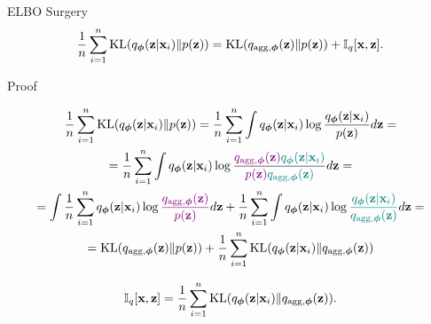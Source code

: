 \documentclass{beamer}
\renewcommand{\eqpause}{}
\renewcommand{\nextonslide}[1]{#1}
\begin{document}
\begin{frame}{ELBO Surgery}
		\vspace{-0.4cm}
		\[
		    \frac{1}{n} \sum_{i=1}^n \mathrm{KL}(q_{\boldsymbol{\phi}}(\mathbf{z}| \mathbf{x}_i) \| p(\mathbf{z})) = \mathrm{KL}(q_{\text{agg}, \boldsymbol{\phi}}(\mathbf{z}) \| p(\mathbf{z})) + \mathbb{I}_q [\mathbf{x}, \mathbf{z}].
		\]
		\vspace{-0.3cm}
	\begin{block}{Proof}
		\vspace{-0.5cm}
		{\footnotesize
		\begin{multline*}
		    \frac{1}{n} \sum_{i=1}^n \KL(q_{\bphi}(\bz| \bx_i) \| p(\bz)) = \frac{1}{n} \sum_{i=1}^n \int q_{\bphi}(\bz| \bx_i) \log \frac{q_{\bphi}(\bz| \bx_i)}{p(\bz)} d \bz
		    \nextonslide{= \\= \frac{1}{n} \sum_{i=1}^n \int q_{\bphi}(\bz| \bx_i) \log \frac{{\color{violet}q_{\text{agg}, \bphi}(\bz)} {\color{teal}q_{\bphi}(\bz| \bx_i)}}{{\color{violet}p(\bz)} {\color{teal}q_{\text{agg}, \bphi}(\bz)}} d \bz}
		    \nextonslide{= \\ = \int \frac{1}{n} \sum_{i=1}^n  q_{\bphi}(\bz| \bx_i) \log {\color{violet}\frac{q_{\text{agg}, \bphi}(\bz)}{p(\bz)}} d \bz + \frac{1}{n}\sum_{i=1}^n \int q_{\bphi}(\bz| \bx_i) \log {\color{teal}\frac{q_{\bphi}(\bz| \bx_i)}{q_{\text{agg}, \bphi}(\bz)}} d \bz}
		    \nextonslide{= \\ = \KL (q_{\text{agg}, \bphi}(\bz) \| p(\bz)) + \frac{1}{n}\sum_{i=1}^n \KL(q_{\bphi}(\bz| \bx_i) \| q_{\text{agg}, \bphi}(\bz))}
		\end{multline*}
        \eqpause
		}
		\vspace{-0.4cm}
		\[
			\mathbb{I}_{q} [\mathbf{x}, \mathbf{z}] = \frac{1}{n}\sum_{i=1}^n \mathrm{KL}(q_{\boldsymbol{\phi}}(\mathbf{z}| \mathbf{x}_i) \| q_{\text{agg}, \boldsymbol{\phi}}(\mathbf{z})).
		\]
	\end{block}
\end{frame}
\end{document}
